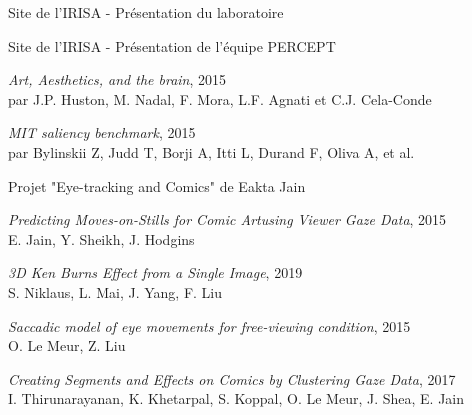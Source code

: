 
\begin{thebibliography}{99}

	  Site de l'IRISA - Présentation du laboratoire\\
      
	  Site de l'IRISA - Présentation de l'équipe PERCEPT\\

    \emph{Art, Aesthetics, and the brain}, 2015\\
    par J.P. Huston, M. Nadal, F. Mora, L.F. Agnati et C.J. Cela-Conde

    \emph{MIT saliency benchmark}, 2015\\
    par Bylinskii Z, Judd T, Borji A, Itti L, Durand F, Oliva A, et al.\\

    Projet "Eye-tracking and Comics" de Eakta Jain\\

    \emph{Predicting Moves-on-Stills for Comic Artusing Viewer Gaze Data}, 2015\\
    E. Jain, Y. Sheikh, J. Hodgins\\

    \emph{3D Ken Burns Effect from a Single Image}, 2019\\
    S. Niklaus, L. Mai, J. Yang, F. Liu\\

    \emph{Saccadic model of eye movements for free-viewing condition}, 2015\\
    O. Le Meur, Z. Liu\\

    \emph{Creating Segments and Effects on Comics by Clustering Gaze Data}, 2017\\
    I. Thirunarayanan, K. Khetarpal, S. Koppal, O. Le Meur, J. Shea, E. Jain\\

\end{thebibliography}
